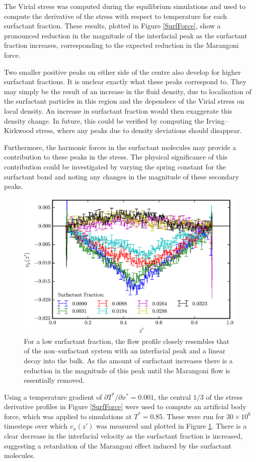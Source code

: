 The Virial stress was computed during the equilibrium simulations and used to compute the derivative of the stress with respect to temperature for each surfactant fraction.
These results, plotted in Figure \ref{SurfForce}, show a pronounced reduction in the magnitude of the interfacial peak as the surfactant fraction increases, corresponding to the expected reduction in the Marangoni force.

Two smaller positive peaks on either side of the centre also develop for higher surfactant fractions.
It is unclear exactly what these peaks correspond to.
They may simply be the result of an increase in the fluid density, due to localisation of the surfactant particles in this region and the dependece of the Virial stress on local density.
An increase in surfactant fraction would then exaggerate this density change.
In future, this could be verified by computing the Irving--Kirkwood stress, where any peaks due to density deviations should disappear.

Furthermore, the harmonic forces in the surfactant molecules may provide a contribution to these peaks in the stress.
The physical significance of this contribution could be investigated by varying the spring constant for the surfactant bond and noting any changes in the magnitude of these secondary peaks.
\FloatBarrier

\begin{figure}[h]
\centering
\includegraphics[scale=0.8]{SurfFlow}
\caption{For a low surfactant fraction, the flow profile closely resembles that of the non--surfactant system with an interfacial peak and a linear decay into the bulk.
As the amount of surfactant increases there is a reduction in the magnitude of this peak until the Marangoni flow is essentially removed.
}
\label{SurfFlow}
\end{figure}
Using a temperature gradient of $\partial T^{*} / \partial x^{*} = 0.001$, the central $1/3$ of the stress derivative profiles in Figure \ref{SurfForce} were used to compute an artificial body force, which was applied to simulations at $T^{*}=0.85$.
These were run for $30 \times 10^{6}$ timesteps over which $v_{x}(z')$ was measured and plotted in Figure \ref{SurfFlow}.
There is a clear decrease in the interfacial velocity as the surfactant fraction is increased, suggesting a retardation of the Marangoni effect induced by the surfactant molecules.

